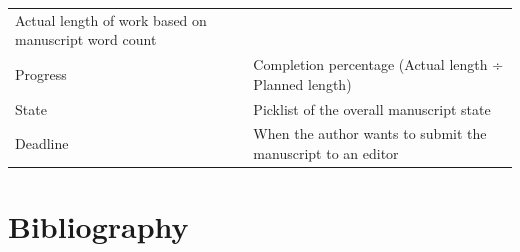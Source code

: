 \documentclass[11pt,openany]{book}
\begin{document}
\begin{longtable}[]{@{}ll@{}}
\begin{minipage}[t]{0.73\columnwidth}
Actual length of work based on manuscript word count\strut
\end{minipage}\tabularnewline
\begin{minipage}[t]{0.21\columnwidth}\raggedright
Progress\strut
\end{minipage} & \begin{minipage}[t]{0.73\columnwidth}\raggedright
Completion percentage (Actual length ÷ Planned length)\strut
\end{minipage}\tabularnewline
\begin{minipage}[t]{0.21\columnwidth}\raggedright
State\strut
\end{minipage} & \begin{minipage}[t]{0.73\columnwidth}\raggedright
Picklist of the overall manuscript state\strut
\end{minipage}\tabularnewline
\begin{minipage}[t]{0.21\columnwidth}\raggedright
Deadline\strut
\end{minipage} & \begin{minipage}[t]{0.73\columnwidth}\raggedright
When the author wants to submit the manuscript to an editor\strut
\end{minipage}\tabularnewline
\bottomrule
\end{longtable}

\newpage{}

\hypertarget{bibliography}{%
\section*{Bibliography}\label{bibliography}}
\end{document}
